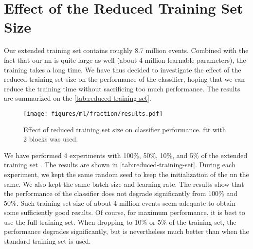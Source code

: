 \section{Effect of the Reduced Training Set Size}

Our extended training set contains roughly 8.7 million events. Combined with the fact that our \gls{nn} is quite large
as well (about 4 million learnable parameters), the training takes a long time. We have thus decided to investigate
the effect of the reduced training set size on the performance of the classifier, hoping that we can reduce the
training time without sacrificing too much performance. The results are summarized on the \autoref{tab:reduced-training-set}.

\begin{figure}[htb]
    \centering
    \texttt{[image: figures/ml/fraction/results.pdf]}
    \caption[Effect of reduced training set size on classifier performance]
    {Effect of reduced training set size on classifier performance. \gls{ftt} with 2 blocks was used.
        \transplot
    }
    \label{tab:reduced-training-set}
\end{figure}

We have performed 4 experiments with 100\%, 50\%, 10\%, and 5\% of the extended training set \ttrn. The results are
shown in \autoref{tab:reduced-training-set}. During each experiment, we kept the same random seed to keep the
initialization of the \gls{nn} the same. We also kept the same batch size and learning rate. The results show that the
performance of the classifier does not degrade significantly from 100\% and 50\%. Such training set size of about 4
million events seem adequate to obtain some sufficiently good results. Of course, for maximum performance, it is best to
use the full training set. When dropping to 10\% or 5\% of the training set, the performance degrades significantly,
but is nevertheless much better than when the standard training set \ttrn is used.
